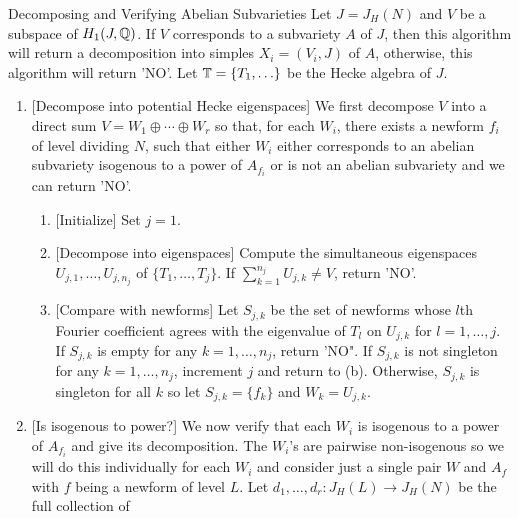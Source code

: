 \documentclass[11pt, proquest]{uwthesis}
\begin{document}
\begin{algorithm}{Decomposing and Verifying Abelian Subvarieties}
    \label{alg:decomp_and_verify_subvarieties}
    Let $J=J_H(N)$ and $V$ be a subspace of $H_1(J, \mathbb{Q})$. If $V$ corresponds
    to a subvariety $A$ of $J$, then this algorithm will return a decomposition
    into simples $X_i=(V_i, J)$ of $A$, otherwise, this algorithm will return
    'NO'. Let $\mathbb{T}=\{T_1,\ldots\}$ be the Hecke algebra of $J$.
    \begin{enumerate}
        \item{} [Decompose into potential Hecke eigenspaces]
            We first decompose $V$ into a direct sum $V=W_1\oplus \cdots \oplus
            W_r$ so that, for each $W_i$, there exists a newform $f_i$ of level
            dividing $N$, such that either $W_i$ either corresponds to an
            abelian subvariety isogenous to a power of $A_{f_i}$ or is not an
            abelian subvariety and we can return 'NO'.
            \begin{enumerate}
                \item{} [Initialize]
                    Set $j=1$.
                \item{} [Decompose into eigenspaces]
                    Compute the simultaneous eigenspaces $U_{j,1},\ldots,U_{j,
                    n_j}$ of $\{T_1,\ldots,T_j\}$. If $\sum_{k=1} ^{n_j}
                    U_{j, k}\neq V$, return 'NO'.
                \item{} [Compare with newforms]
                    Let $S_{j,k}$ be the set of newforms whose $l$th Fourier
                    coefficient agrees with the eigenvalue of $T_l$ on $U_{j,
                    k}$ for $l=1,\ldots,j$. If $S_{j, k}$ is empty for any
                    $k=1,\ldots,n_j$, return 'NO". If $S_{j,k}$ is not
                    singleton for any $k=1,\ldots, n_j$, increment $j$ and
                    return to (b). Otherwise, $S_{j,k}$ is singleton for all
                    $k$ so let $S_{j,k}=\{f_k\}$ and $W_k=U_{j,k}$.
            \end{enumerate}
        \item{} [Is isogenous to power?]
            We now verify that each $W_i$ is isogenous to a power of $A_{f_i}$
            and give its decomposition. The $W_i$'s are pairwise non-isogenous
            so we will do this individually for each $W_i$ and consider just a
            single pair $W$ and $A_f$ with $f$ being a newform of level $L$.
            Let $d_1,\ldots,d_r:J_H(L)\to J_H(N)$ be the full collection of

\end{enumerate}
\end{algorithm}
\end{document}
